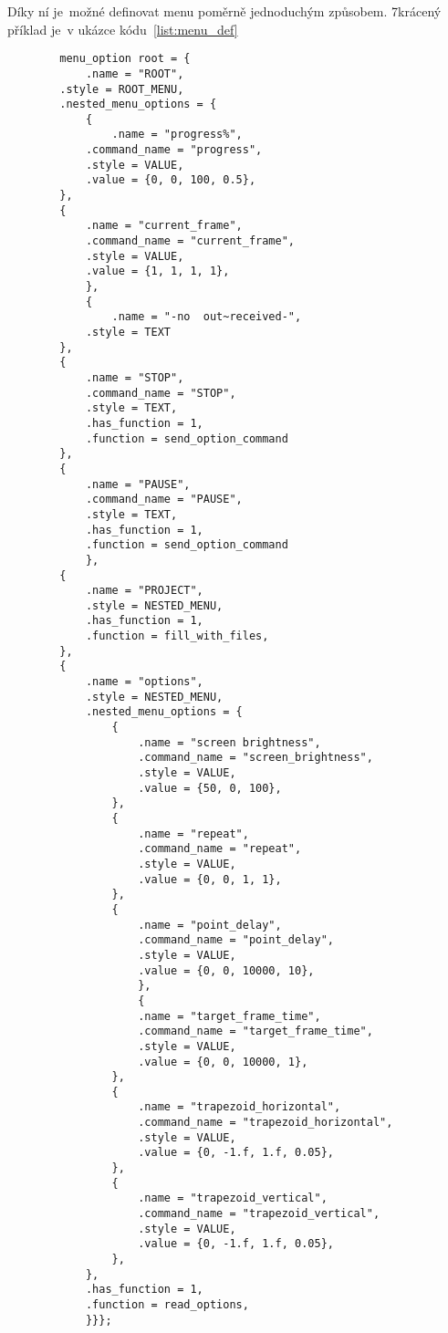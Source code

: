 Díky ní je~možné definovat menu poměrně jednoduchým způsobem. 7krácený příklad  je~v ukázce kódu~\ref{list:menu_def}
\begin{code}
    \begin{verbatim}
        menu_option root = {
            .name = "ROOT",
        .style = ROOT_MENU,
        .nested_menu_options = {
            {
                .name = "progress%",
            .command_name = "progress",
            .style = VALUE,
            .value = {0, 0, 100, 0.5},
        },
        {
            .name = "current_frame",
            .command_name = "current_frame",
            .style = VALUE,
            .value = {1, 1, 1, 1},
            },
            {
                .name = "-no  out~received-",
            .style = TEXT
        },
        {
            .name = "STOP",
            .command_name = "STOP",
            .style = TEXT,
            .has_function = 1,
            .function = send_option_command
        },
        {
            .name = "PAUSE",
            .command_name = "PAUSE",
            .style = TEXT,
            .has_function = 1,
            .function = send_option_command
            },
        {
            .name = "PROJECT",
            .style = NESTED_MENU,
            .has_function = 1,
            .function = fill_with_files,
        },
        {
            .name = "options",
            .style = NESTED_MENU,
            .nested_menu_options = {
                {
                    .name = "screen brightness",
                    .command_name = "screen_brightness",
                    .style = VALUE,
                    .value = {50, 0, 100},
                },
                {
                    .name = "repeat",
                    .command_name = "repeat",
                    .style = VALUE,
                    .value = {0, 0, 1, 1},
                },
                {
                    .name = "point_delay",
                    .command_name = "point_delay",
                    .style = VALUE,
                    .value = {0, 0, 10000, 10},
                    },
                    {
                    .name = "target_frame_time",
                    .command_name = "target_frame_time",
                    .style = VALUE,
                    .value = {0, 0, 10000, 1},
                },
                {
                    .name = "trapezoid_horizontal",
                    .command_name = "trapezoid_horizontal",
                    .style = VALUE,
                    .value = {0, -1.f, 1.f, 0.05},
                },
                {
                    .name = "trapezoid_vertical",
                    .command_name = "trapezoid_vertical",
                    .style = VALUE,
                    .value = {0, -1.f, 1.f, 0.05},
                },
            },
            .has_function = 1,
            .function = read_options,
            }}};
        \end{verbatim}
    \end{code}
        
